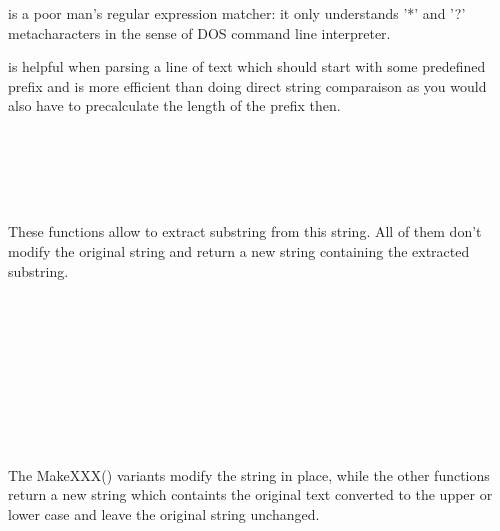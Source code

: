  is a poor man's regular expression matcher:
it only understands '*' and '?' metacharacters in the sense of DOS command line
interpreter.

 is helpful when parsing a line of
text which should start with some predefined prefix and is more efficient than
doing direct string comparaison as you would also have to precalculate the
length of the prefix then.

\\
\\
\\
\\


These functions allow to extract substring from this string. All of them don't
modify the original string and return a new string containing the extracted
substring.

\\
\\
\\
\\
\\
\\
\\
\\


The MakeXXX() variants modify the string in place, while the other functions
return a new string which containts the original text converted to the upper or
lower case and leave the original string unchanged.

\\
\\
\\


